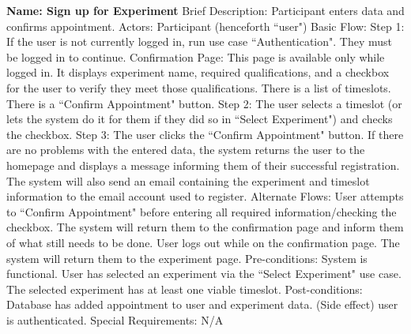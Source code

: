 \begin{outline}[enumerate]
\1 {\bf Name: Sign up for Experiment}
\2 Brief Description: Participant enters data and confirms appointment.
\2 Actors: Participant (henceforth ``user")
\2 Basic Flow:
\3 Step 1: If the user is not currently logged in, run use case ``Authentication".  They must be logged in to continue.
\3 Confirmation Page: This page is available only while logged in.  It displays experiment name, required qualifications, and a checkbox for the user to verify they meet those qualifications. There is a list of timeslots. There is a ``Confirm Appointment" button.
\3 Step 2: The user selects a timeslot (or lets the system do it for them if they did so in ``Select Experiment") and checks the checkbox.
\3 Step 3: The user clicks the ``Confirm Appointment" button.
\3 If there are no problems with the entered data, the system returns the user to the homepage and displays a message informing them of their successful registration.  The system will also send an email containing the experiment and timeslot information to the email account used to register.
\2 Alternate Flows:
\3 User attempts to ``Confirm Appointment" before entering all required information/checking the checkbox.
\4 The system will return them to the confirmation page and inform them of what still needs to be done.
\3 User logs out while on the confirmation page.  The system will return them to the experiment page.
\2 Pre-conditions:
\3 System is functional.
\3 User has selected an experiment via the ``Select Experiment" use case.
\3 The selected experiment has at least one viable timeslot.
\2 Post-conditions:
\3 Database has added appointment to user and experiment data.
\3 (Side effect) user is authenticated.
\2 Special Requirements:
\3 N/A


\end{outline}
